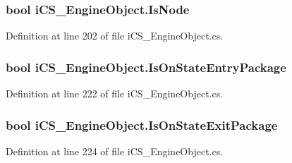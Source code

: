 \hypertarget{classi_c_s___engine_object_a21695e630f058dd73681e3ccbee5f967}{
\subsubsection[{Is\+Node}]{\setlength{\rightskip}{0pt plus 5cm}bool i\+C\+S\+\_\+\+Engine\+Object.\+Is\+Node\hspace{0.3cm}{\ttfamily [get]}}}\label{classi_c_s___engine_object_a21695e630f058dd73681e3ccbee5f967}


Definition at line 202 of file i\+C\+S\+\_\+\+Engine\+Object.\+cs.

\hypertarget{classi_c_s___engine_object_aed723301754e942948e46cab8ba0a4b7}{
\subsubsection[{Is\+On\+State\+Entry\+Package}]{\setlength{\rightskip}{0pt plus 5cm}bool i\+C\+S\+\_\+\+Engine\+Object.\+Is\+On\+State\+Entry\+Package\hspace{0.3cm}{\ttfamily [get]}}}\label{classi_c_s___engine_object_aed723301754e942948e46cab8ba0a4b7}


Definition at line 222 of file i\+C\+S\+\_\+\+Engine\+Object.\+cs.

\hypertarget{classi_c_s___engine_object_a33cd8eef8295dc2fa78470fc87da3fd7}{
\subsubsection[{Is\+On\+State\+Exit\+Package}]{\setlength{\rightskip}{0pt plus 5cm}bool i\+C\+S\+\_\+\+Engine\+Object.\+Is\+On\+State\+Exit\+Package\hspace{0.3cm}{\ttfamily [get]}}}\label{classi_c_s___engine_object_a33cd8eef8295dc2fa78470fc87da3fd7}


Definition at line 224 of file i\+C\+S\+\_\+\+Engine\+Object.\+cs.

